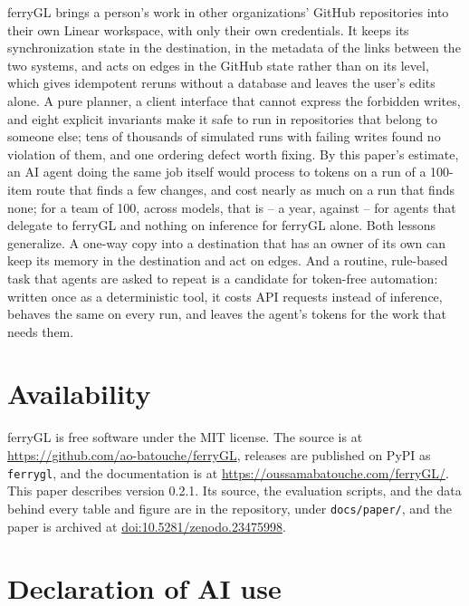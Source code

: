 \documentclass[11pt,a4paper]{article}
\newcommand{\ferry}{ferryGL}
\newcommand{\code}[1]{\texttt{#1}}
\newcommand{\version}{0.2.1}
\newcommand{\paperdoi}{10.5281/zenodo.23475998}
\begin{document}
\ferry{} brings a person's work in other organizations' GitHub repositories into their own
Linear workspace, with only their own credentials. It keeps its synchronization state in the
destination, in the metadata of the links between the two systems, and acts on edges in the
GitHub state rather than on its level, which gives idempotent reruns without a database and
leaves the user's edits alone. A pure planner, a client interface that cannot express the
forbidden writes, and eight explicit invariants make it safe to run in repositories that belong
to someone else; tens of thousands of simulated runs with failing writes found no violation of
them, and one ordering defect worth fixing. By this paper's estimate, an AI agent doing the same
job itself would process \TokLeanOpusHundred{} to \TokPlausibleOpusHundred{} tokens on a run of a
100-item route that finds a few changes, and cost nearly as much on a run that finds none; for a
team of 100, across \CmpModels{} models, that is \CmpItselfHundredMin{}--\CmpItselfHundredMax{} a year,
against \CmpDelegatingHundredMin{}--\CmpDelegatingHundredMax{} for agents that delegate to
\ferry{} and nothing on inference for \ferry{} alone. Both lessons generalize. A one-way copy into
a destination that has an owner of its own can keep its memory in the destination and act on
edges. And a routine, rule-based task that agents are asked to repeat is a candidate for
token-free automation: written once as a deterministic tool, it costs API requests instead of
inference, behaves the same on every run, and leaves the agent's tokens for the work that needs
them.

\section*{Availability}

\ferry{} is free software under the MIT license. The source is at
\url{https://github.com/ao-batouche/ferryGL}, releases are published on PyPI as \code{ferrygl},
and the documentation is at \url{https://oussamabatouche.com/ferryGL/}. This paper describes
version \version. Its source, the evaluation scripts, and the data behind every table and figure
are in the repository, under \code{docs/paper/}, and the paper is archived at
\href{https://doi.org/\paperdoi}{doi:\paperdoi}.

\section*{Declaration of AI use}
\end{document}
